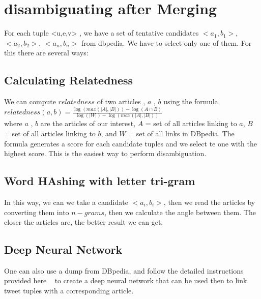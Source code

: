 \section{ disambiguating after Merging }
For each tuple <u,e,v> , we have a set of tentative candidates $<a_1, b_1>$, $<a_2, b_2>$, $<a_n, b_n>$ from dbpedia. 
We have to select only one of them. For this there are several ways:
\subsection{Calculating Relatedness}
 We can compute $ relatedness $ of two articles , $a$ , $b$ using the formula \\
  $ relatedness(a,b) = \frac{\log(max(|A|, |B|)) - \log(A \cap B) }{ \log( |W| ) - \log(max(|A|, |B|)) } $ \\

where $a$ , $b$ are the articles of our interest, $A$  = set of all articles linking to $a$, $B$ = set of all articles linking to $b$, 
and $W$ = set of all links in DBpedia. The formula generates a score for each candidate tuples and we select te one with the highest score.
This is the easiest way to perform disambiguation.   

\subsection{ Word HAshing with letter tri-gram }
In this way, we can we take a candidate $<a_i, b_i>$, then we read the articles by converting them into $n-grams$, 
then we calculate the angle between them. The closer the articles are, the better result we can get. 

\subsection{ Deep Neural Network } 
One can also use a dump from DBpedia, and follow the detailed instructions provided here ~\cite{ref1DeepLearning} 
to create a deep neural network that can be used then to link tweet tuples with a corresponding article.

\endinput